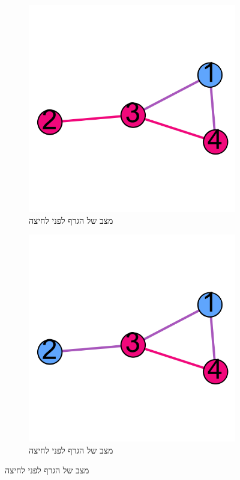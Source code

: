\documentclass[12pt,leqno]{article}
\theoremstyle{theoremdd}
\begin{document}
\begin{figure}[ht]
    \caption{
        דוגמה לתיאור וקטור שינוי במהלך משחק על גרף
        }
    \label{fig: change vector on graph}
    \centering
    \begin{subfigure}[b]{.4\linewidth}
        \caption{מצב של הגרף לפני לחיצה}
        \label{fig:start graph presses}
        \centering
        \includegraphics[width=.7\textwidth,keepaspectratio]{images/graph_presses.png}
    \end{subfigure}
    \begin{subfigure}[b]{.4\linewidth}
        \caption{מצב של הגרף לפני לחיצה}
        \label{fig:start graph presses solution}
        \centering
        \includegraphics[width=.7\textwidth,keepaspectratio]{images/graph_presses_solve.png}
    \end{subfigure}
\end{figure}
\end{document}
